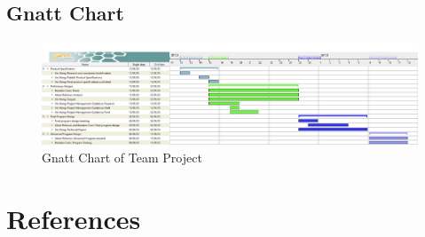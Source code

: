 \documentclass[12pt,a4paper]{article}
\begin{document}
\begin{landscape}
	\subsection{Gnatt Chart}
	\begin{center}
		\begin{figure}[htb]
		\includegraphics[width=\linewidth]{Project Gnatt.PNG}
		\caption{Gnatt Chart of Team Project}
		\label{fig:landscape}
		\end{figure}
	\end{center}
\end{landscape}
\pagebreak

\section{References}
\printbibliography
\end{document}
